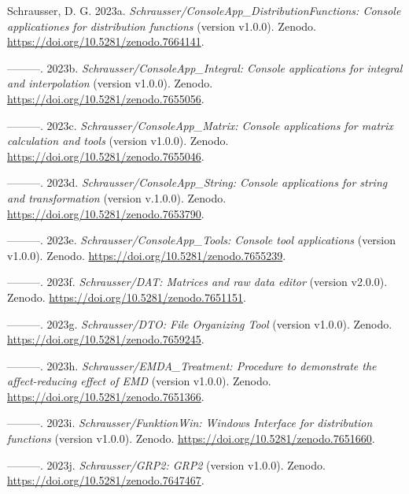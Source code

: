 \documentclass[
]{article}
\author{}
\date{}
\newlength{\cslhangindent}
\newlength{\cslentryspacingunit} %
\newenvironment{CSLReferences}[2] %
 {%
  \setlength{\parindent}{0pt}
  \ifodd #1
  \let\oldpar\par
  \def\par{\hangindent=\cslhangindent\oldpar}
  \fi
  \setlength{\parskip}{#2\cslentryspacingunit}
 }%
 {}
\begin{document}
\hypertarget{refs}{}
\begin{CSLReferences}{1}{0}
\leavevmode{}%
Schrausser, D. G. 2023a.
\emph{{Schrausser/ConsoleApp\_DistributionFunctions: Console
applicationes for distribution functions}} (version v1.0.0). Zenodo.
\url{https://doi.org/10.5281/zenodo.7664141}.

\leavevmode{}%
---------. 2023b. \emph{{Schrausser/ConsoleApp\_Integral: Console
applications for integral and interpolation}} (version v1.0.0). Zenodo.
\url{https://doi.org/10.5281/zenodo.7655056}.

\leavevmode{}%
---------. 2023c. \emph{{Schrausser/ConsoleApp\_Matrix: Console
applications for matrix calculation and tools}} (version v1.0.0).
Zenodo. \url{https://doi.org/10.5281/zenodo.7655046}.

\leavevmode{}%
---------. 2023d. \emph{{Schrausser/ConsoleApp\_String: Console
applications for string and transformation}} (version v.1.0.0). Zenodo.
\url{https://doi.org/10.5281/zenodo.7653790}.

\leavevmode{}%
---------. 2023e. \emph{{Schrausser/ConsoleApp\_Tools: Console tool
applications}} (version v1.0.0). Zenodo.
\url{https://doi.org/10.5281/zenodo.7655239}.

\leavevmode{}%
---------. 2023f. \emph{{Schrausser/DAT: Matrices and raw data editor}}
(version v2.0.0). Zenodo. \url{https://doi.org/10.5281/zenodo.7651151}.

\leavevmode{}%
---------. 2023g. \emph{{Schrausser/DTO: File Organizing Tool}} (version
v1.0.0). Zenodo. \url{https://doi.org/10.5281/zenodo.7659245}.

\leavevmode{}%
---------. 2023h. \emph{{Schrausser/EMDA\_Treatment: Procedure to
demonstrate the affect-reducing effect of EMD}} (version {v1.0.0}).
Zenodo. \url{https://doi.org/10.5281/zenodo.7651366}.

\leavevmode{}%
---------. 2023i. \emph{{Schrausser/FunktionWin: Windows Interface for
distribution functions}} (version {v1.0.0}). Zenodo.
\url{https://doi.org/10.5281/zenodo.7651660}.

\leavevmode{}%
---------. 2023j. \emph{{Schrausser/GRP2: GRP2}} (version {v1.0.0}).
Zenodo. \url{https://doi.org/10.5281/zenodo.7647467}.


\end{CSLReferences}
\end{document}
